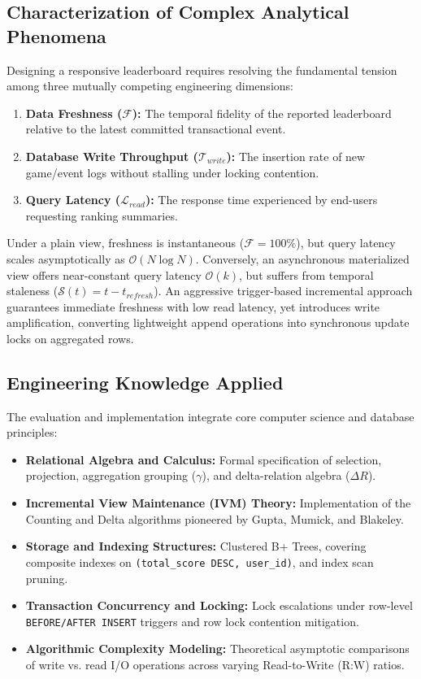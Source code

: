 \documentclass[11pt,a4paper]{report}
\begin{document}
\subsection{Characterization of Complex Analytical Phenomena}
Designing a responsive leaderboard requires resolving the fundamental tension among three mutually competing engineering dimensions:
\begin{enumerate}
    \item \textbf{Data Freshness ($\mathcal{F}$):} The temporal fidelity of the reported leaderboard relative to the latest committed transactional event.
    \item \textbf{Database Write Throughput ($\mathcal{T}_{write}$):} The insertion rate of new game/event logs without stalling under locking contention.
    \item \textbf{Query Latency ($\mathcal{L}_{read}$):} The response time experienced by end-users requesting ranking summaries.
\end{enumerate}

Under a plain view, freshness is instantaneous ($\mathcal{F} = 100\%$), but query latency scales asymptotically as $\mathcal{O}(N \log N)$. Conversely, an asynchronous materialized view offers near-constant query latency $\mathcal{O}(k)$, but suffers from temporal staleness ($\mathcal{S}(t) = t - t_{refresh}$). An aggressive trigger-based incremental approach guarantees immediate freshness with low read latency, yet introduces write amplification, converting lightweight append operations into synchronous update locks on aggregated rows.

\subsection{Engineering Knowledge Applied}
The evaluation and implementation integrate core computer science and database principles:
\begin{itemize}
    \item \textbf{Relational Algebra and Calculus:} Formal specification of selection, projection, aggregation grouping ($\gamma$), and delta-relation algebra ($\Delta R$).
    \item \textbf{Incremental View Maintenance (IVM) Theory:} Implementation of the Counting and Delta algorithms pioneered by Gupta, Mumick, and Blakeley.
    \item \textbf{Storage and Indexing Structures:} Clustered B+ Trees, covering composite indexes on \texttt{(total\_score DESC, user\_id)}, and index scan pruning.
    \item \textbf{Transaction Concurrency and Locking:} Lock escalations under row-level \texttt{BEFORE/AFTER INSERT} triggers and row lock contention mitigation.
    \item \textbf{Algorithmic Complexity Modeling:} Theoretical asymptotic comparisons of write vs. read I/O operations across varying Read-to-Write ($\text{R:W}$) ratios.
\end{itemize}
\end{document}

